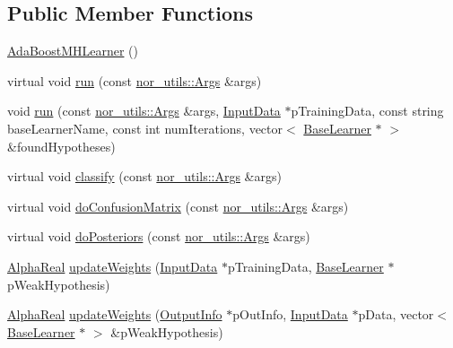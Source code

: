 \subsection*{Public Member Functions}
\begin{DoxyCompactItemize}
\item 
\hyperlink{classMultiBoost_1_1AdaBoostMHLearner_a583ec3dfcb01bf1ae5270a8b60c50479}{Ada\-Boost\-M\-H\-Learner} ()
\item 
virtual void \hyperlink{classMultiBoost_1_1AdaBoostMHLearner_a1171d948bfa1875bf663993f067a8e8d}{run} (const \hyperlink{classnor__utils_1_1Args}{nor\-\_\-utils\-::\-Args} \&args)
\item 
void \hyperlink{classMultiBoost_1_1AdaBoostMHLearner_a6cc18ddef41bb0a8981e03c4e5b41be2}{run} (const \hyperlink{classnor__utils_1_1Args}{nor\-\_\-utils\-::\-Args} \&args, \hyperlink{classMultiBoost_1_1InputData}{Input\-Data} $\ast$p\-Training\-Data, const string base\-Learner\-Name, const int num\-Iterations, vector$<$ \hyperlink{classMultiBoost_1_1BaseLearner}{Base\-Learner} $\ast$ $>$ \&found\-Hypotheses)
\item 
virtual void \hyperlink{classMultiBoost_1_1AdaBoostMHLearner_ab2370f7d03a14d9cb67e130e3814a6f0}{classify} (const \hyperlink{classnor__utils_1_1Args}{nor\-\_\-utils\-::\-Args} \&args)
\item 
virtual void \hyperlink{classMultiBoost_1_1AdaBoostMHLearner_a234cd2586240f3a07dcbe5186babf8ad}{do\-Confusion\-Matrix} (const \hyperlink{classnor__utils_1_1Args}{nor\-\_\-utils\-::\-Args} \&args)
\item 
virtual void \hyperlink{classMultiBoost_1_1AdaBoostMHLearner_ab0067a96a9a7c2648cb0cfc8a97d8004}{do\-Posteriors} (const \hyperlink{classnor__utils_1_1Args}{nor\-\_\-utils\-::\-Args} \&args)
\item 
\hyperlink{Defaults_8h_a80184c4fd10ab70a1a17c5f97dcd1563}{Alpha\-Real} \hyperlink{classMultiBoost_1_1AdaBoostMHLearner_a909140ca1b8174c42695e57065b3c8b9}{update\-Weights} (\hyperlink{classMultiBoost_1_1InputData}{Input\-Data} $\ast$p\-Training\-Data, \hyperlink{classMultiBoost_1_1BaseLearner}{Base\-Learner} $\ast$p\-Weak\-Hypothesis)
\item 
\hyperlink{Defaults_8h_a80184c4fd10ab70a1a17c5f97dcd1563}{Alpha\-Real} \hyperlink{classMultiBoost_1_1AdaBoostMHLearner_a496a96f5c332bc11bd0c680a62964344}{update\-Weights} (\hyperlink{classMultiBoost_1_1OutputInfo}{Output\-Info} $\ast$p\-Out\-Info, \hyperlink{classMultiBoost_1_1InputData}{Input\-Data} $\ast$p\-Data, vector$<$ \hyperlink{classMultiBoost_1_1BaseLearner}{Base\-Learner} $\ast$ $>$ \&p\-Weak\-Hypothesis)

\end{DoxyCompactItemize}
